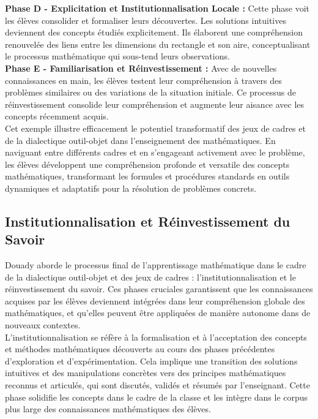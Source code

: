 \textbf{Phase D - Explicitation et Institutionnalisation Locale :}
Cette phase voit les élèves consolider et formaliser leurs découvertes.
Les solutions intuitives deviennent des concepts étudiés explicitement.
Ils élaborent une compréhension renouvelée des liens entre les dimensions du rectangle et son aire,
conceptualisant le processus mathématique qui sous-tend leurs observations.\\

\textbf{Phase E - Familiarisation et Réinvestissement :}
Avec de nouvelles connaissances en main,
les élèves testent leur compréhension à travers des problèmes similaires ou des variations de la situation initiale.
Ce processus de réinvestissement consolide leur compréhension et augmente leur aisance avec les concepts récemment acquis.\\

Cet exemple illustre efficacement le potentiel transformatif des jeux de cadres et de la dialectique outil-objet dans l'enseignement des mathématiques.
En naviguant entre différents cadres et en s'engageant activement avec le problème,
les élèves développent une compréhension profonde et versatile des concepts mathématiques,
transformant les formules et procédures standards en outils dynamiques et adaptatifs pour la résolution de problèmes concrets.

\subsection{Institutionnalisation et Réinvestissement du Savoir}

Douady aborde le processus final de l'apprentissage mathématique dans le cadre de la dialectique outil-objet et des jeux de cadres :
l'institutionnalisation et le réinvestissement du savoir.
Ces phases cruciales garantissent que les connaissances acquises par les élèves deviennent intégrées dans leur compréhension globale des mathématiques,
et qu'elles peuvent être appliquées de manière autonome dans de nouveaux contextes.\\

L'institutionnalisation se réfère à la formalisation et à l'acceptation des concepts et méthodes mathématiques découverts au cours des phases précédentes d'exploration et d'expérimentation.
Cela implique une transition des solutions intuitives et des manipulations concrètes vers des principes mathématiques reconnus et articulés,
qui sont discutés,
validés et résumés par l'enseignant.
Cette phase solidifie les concepts dans le cadre de la classe et les intègre dans le corpus plus large des connaissances mathématiques des élèves.\\

